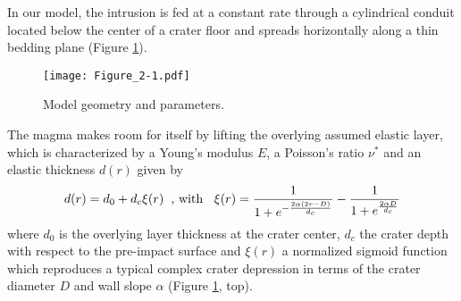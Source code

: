 In  our model,  the intrusion  is  fed at  a constant  rate through  a
cylindrical conduit  located below  the center of  a crater  floor and
spreads   horizontally   along   a    thin   bedding   plane   (Figure
\ref{C6-Figure2-1}).
\begin{figure}[h!]
  \graphicspath{ {/Users/thorey/Documents/These/Projet/FFC/Gravi_GRAIL/Article/Papier/SOUMISSION_2_EPSL/} }
  \begin{center}
    \texttt{[image: Figure\_2-1.pdf]}
    \caption{Model geometry and parameters.}
    \label{C6-Figure2-1}
  \end{center}
\end{figure}
The  magma makes  room for  itself by  lifting the  overlying assumed
elastic  layer, which  is characterized  by a  Young's modulus  $E$, a
Poisson's ratio $\nu^*$ and an elastic thickness $d(r)$ given by
\begin{equation}
  d(r)=d_0+d_c\xi(r)\hspace{.2cm}\text{, with }\hspace{.2cm} \xi(r)=\frac{1}{1+e^{-\frac{2\alpha(2r-D)}{d_c}}}-\frac{1}{1+e^{\frac{2\alpha D}{d_c}}}\label{C6-topo}\\
\end{equation}
where $d_0$ is  the overlying layer thickness at  the crater center,
$d_c$  the crater  depth with  respect to  the pre-impact  surface and
$\xi(r)$  a normalized  sigmoid  function which  reproduces a  typical
complex crater depression in terms of the crater diameter $D$ and wall
slope $\alpha$ (Figure \ref{C6-Figure2-1}, top).

